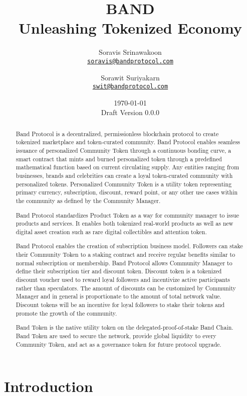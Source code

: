 \documentclass[letterpaper,11pt]{article}
\title{\LARGE BAND\\
    \Large Unleashing Tokenized Economy}
\author{
        Soravis Srinawakoon\\
        \small\href{mailto:soravis@bandprotocol.com}
            {\nolinkurl{soravis@bandprotocol.com}}
    \and
        Sorawit Suriyakarn\\
        \small\href{mailto:swit@bandprotocol.com}
            {\nolinkurl{swit@bandprotocol.com}}
    }
\date{\today\\\small Draft Version 0.0.0}
\begin{document}
\maketitle

\begin{abstract}

Band Protocol is a decentralized, permissionless blockchain protocol to create tokenized marketplace and token-curated community. Band Protocol enables seamless issuance of personalized Community Token through a continuous bonding curve, a smart contract that mints and burned personalized token through a predefined mathematical function based on current circulating supply. Any entities ranging from businesses, brands and celebrities can create a loyal token-curated community with personalized tokens. Personalized Community Token is a utility token representing primary currency, subscription, discount, reward point, or any other use cases within the community as defined by the Community Manager.

Band Protocol standardizes Product Token as a way for community manager to issue products and services. It enables both tokenized real-world products as well as new digital asset creation such as rare digital collectibles and attention token.

Band Protocol enables the creation of subscription business model. Followers can stake their Community Token to a staking contract and receive regular benefits similar to normal subscription or membership. Band Protocol allows Community Manager to define their subscription tier and discount token. Discount token is a tokenized discount voucher used to reward loyal followers and incentivize active participants rather than speculators. The amount of discounts can be customized by Community Manager and in general is proportionate to the amount of total network value. Discount tokens will be an incentive for loyal followers to stake their tokens and promote the growth of the community.

Band Token is the native utility token on the delegated-proof-of-stake Band Chain. Band Token are used to secure the network, provide global liquidity to every Community Token, and act as a governance token for future protocol upgrade.

\end{abstract}

\newpage
{
\hypersetup{linkcolor=black}
\tableofcontents
}
\newpage

\section{Introduction}
\end{document}
